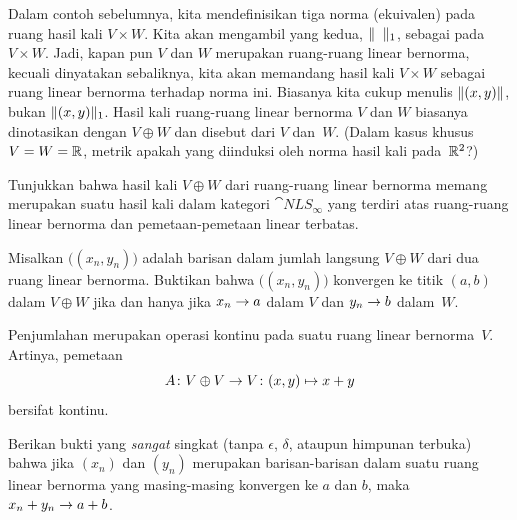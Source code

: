 \begin{conv}\label{C023414} Dalam contoh sebelumnya, kita mendefinisikan tiga norma (ekuivalen) pada
ruang hasil kali $V \times W$. Kita akan mengambil yang kedua, $\lVert\;\;\rVert_1$, sebagai
 pada $V \times W$. Jadi, kapan pun $V$ dan $W$ merupakan ruang-ruang linear bernorma,
kecuali dinyatakan sebaliknya, kita akan memandang hasil kali $V \times W$ sebagai ruang
linear bernorma terhadap norma ini. Biasanya kita cukup menulis $\lVert(x,y)\rVert$, bukan
$\lVert(x,y)\rVert_1$. Hasil kali ruang-ruang linear bernorma $V$ dan $W$ biasanya dinotasikan
dengan $V \oplus W$ dan disebut
 dari $V$ dan~$W$. (Dalam kasus khusus $V = W = \mathbb{R}$, metrik apakah yang
diinduksi oleh norma hasil kali pada~$\mathbb{R}^2$?)
\end{conv}

\begin{exam}\label{exam_prod_nls} Tunjukkan bahwa hasil kali $V \oplus W$ dari ruang-ruang linear bernorma memang merupakan suatu hasil kali
dalam kategori $\cat{NLS_{\boldsymbol\infty}}$ yang terdiri atas ruang-ruang linear bernorma dan pemetaan-pemetaan
linear terbatas.
\end{exam}

\begin{prop} Misalkan $\bigl((x_n,y_n)\bigr)$ adalah barisan dalam jumlah langsung $V \oplus W$ dari dua ruang linear
bernorma. Buktikan bahwa $\bigl((x_n,y_n)\bigr)$ konvergen ke titik $(a,b)$ dalam $V \oplus W$ jika dan hanya
jika $x_n \rightarrow a$ dalam $V$ dan $y_n \rightarrow b$ dalam~$W$.
\end{prop}

\begin{prop}\label{C023427} Penjumlahan merupakan operasi kontinu pada suatu ruang linear bernorma~$V$.
Artinya, pemetaan
   \[ A \colon V \oplus V \rightarrow V \colon (x,y) \mapsto x + y \]
bersifat kontinu.
\end{prop}

\begin{exer} Berikan bukti yang \emph{sangat} singkat (tanpa $\epsilon$, $\delta$, ataupun himpunan terbuka) bahwa jika
$(x_n)$ dan $(y_n)$ merupakan barisan-barisan dalam suatu ruang linear bernorma yang masing-masing konvergen ke $a$ dan $b$,
maka $x_n + y_n \rightarrow a + b$.
\end{exer}

